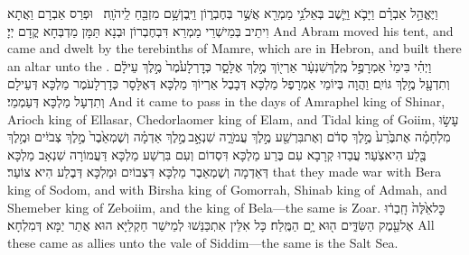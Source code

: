 {וַיֶּאֱהַ֣ל אַבְרָ֗ם וַיָּבֹ֛א וַיֵּ֛שֶׁב בְּאֵלֹנֵ֥י מַמְרֵ֖א אֲשֶׁ֣ר בְּחֶבְר֑וֹן וַיִּֽבֶן\maqqaf שָׁ֥ם מִזְבֵּ֖חַ לַֽיהֹוָֽה׃ \petucha }
{וּפְרַס אַבְרָם וַאֲתָא וִיתֵיב בְּמֵישְׁרֵי מַמְרֵא דִּבְחֶבְרוֹן וּבְנָא תַּמָּן מַדְבְּחָא קֳדָם יְיָ׃}
{And Abram moved his tent, and came and dwelt by the terebinths of Mamre, which are in Hebron, and built there an altar unto the \lord.}{}
\newperek
{}
{וַיְהִ֗י בִּימֵי֙ אַמְרָפֶ֣ל מֶֽלֶךְ\maqqaf שִׁנְעָ֔ר אַרְי֖וֹךְ מֶ֣לֶךְ אֶלָּסָ֑ר כְּדׇרְלָעֹ֙מֶר֙ מֶ֣לֶךְ עֵילָ֔ם וְתִדְעָ֖ל מֶ֥לֶךְ גּוֹיִֽם׃}
{וַהֲוָה בְּיוֹמֵי אַמְרָפֶל מַלְכָּא דְּבָבֶל אַרְיוֹךְ מַלְכָּא דְּאֶלָּסָר כְּדָרְלָעֹמֶר מַלְכָּא דְּעֵילָם וְתִדְעָל מַלְכָּא דְּעַמְמֵי׃}
{And it came to pass in the days of Amraphel king of Shinar, Arioch king of Ellasar, Chedorlaomer king of Elam, and Tidal king of Goiim,}{}
{עָשׂ֣וּ מִלְחָמָ֗ה אֶת\maqqaf בֶּ֙רַע֙ מֶ֣לֶךְ סְדֹ֔ם וְאֶת\maqqaf בִּרְשַׁ֖ע מֶ֣לֶךְ עֲמֹרָ֑ה שִׁנְאָ֣ב \legarmeh  מֶ֣לֶךְ אַדְמָ֗ה וְשֶׁמְאֵ֙בֶר֙ מֶ֣לֶךְ צְבֹיִ֔ים וּמֶ֥לֶךְ בֶּ֖לַע הִיא\maqqaf צֹֽעַר׃}
{עֲבַדוּ קְרָבָא עִם בֶּרַע מַלְכָּא דִּסְדוֹם וְעִם בִּרְשַׁע מַלְכָּא דַּעֲמוֹרָה שִׁנְאָב מַלְכָּא דְּאַדְמָה וְשֶׁמְאֵבֶר מַלְכָּא דִּצְבוֹיִם וּמַלְכָּא דְּבֶלַע הִיא צוֹעַר׃}
{that they made war with Bera king of Sodom, and with Birsha king of Gomorrah, Shinab king of Admah, and Shemeber king of Zeboiim, and the king of Bela—the same is Zoar.}{}
{כׇּל\maqqaf אֵ֙לֶּה֙ חָֽבְר֔וּ אֶל\maqqaf עֵ֖מֶק הַשִּׂדִּ֑ים ה֖וּא יָ֥ם הַמֶּֽלַח׃}
{כָּל אִלֵּין אִתְכַּנַּשׁוּ לְמֵישַׁר חַקְלַיָּא הוּא אֲתַר יַמָּא דְּמִלְחָא׃}
{All these came as allies unto the vale of Siddim—the same is the Salt Sea.}{}
